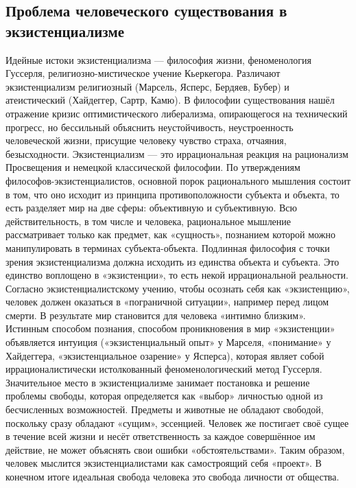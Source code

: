 \documentclass[12pt]{article}
\begin{document}
\subsection{Проблема человеческого существования в экзистенциализме}
Идейные истоки экзистенциализма — философия жизни, феноменология Гуссерля, религиозно-мистическое
учение  Кьеркегора.  Различают  экзистенциализм  религиозный  (Марсель,  Ясперс,  Бердяев,  Бубер)  и
атеистический  (Хайдеггер,  Сартр,  Камю).  В  философии  существования  нашёл  отражение  кризис
оптимистического  либерализма,  опирающегося  на  технический  прогресс,  но  бессильный  объяснить
неустойчивость,  неустроенность  человеческой  жизни,  присущие  человеку  чувство  страха,  отчаяния,
безысходности.
Экзистенциализм  —  это  иррациональная  реакция  на  рационализм  Просвещения  и  немецкой  классической
философии.  По  утверждениям  философов-экзистенциалистов,  основной  порок  рационального  мышления
состоит в том, что оно исходит из принципа противоположности субъекта и объекта, то есть разделяет мир на
две  сферы:  объективную  и  субъективную.  Всю  действительность,  в  том  числе  и  человека,  рациональное
мышление рассматривает только как предмет, как «сущность», познанием которой можно манипулировать в
терминах  субъекта-объекта.  Подлинная  философия  с  точки  зрения  экзистенциализма  должна  исходить  из
единства  объекта  и  субъекта.  Это  единство  воплощено  в  «экзистенции»,  то  есть  некой  иррациональной
реальности.
Согласно экзистенциалистскому учению, чтобы осознать себя как «экзистенцию», человек должен оказаться в
«пограничной ситуации», например перед лицом смерти. В результате мир становится для человека «интимно
близким». Истинным способом познания, способом проникновения в мир «экзистенции» объявляется интуиция
(«экзистенциальный опыт» у Марселя, «понимание» у Хайдеггера, «экзистенциальное озарение» у Ясперса),
которая являет собой иррационалистически истолкованный феноменологический метод Гуссерля.
Значительное  место  в  экзистенциализме  занимает  постановка  и  решение  проблемы  свободы,  которая
определяется  как  «выбор»  личностью  одной  из  бесчисленных  возможностей.  Предметы  и  животные  не
обладают свободой, поскольку сразу обладают «сущим», эссенцией. Человек же постигает своё сущее в течение
всей жизни и несёт ответственность за каждое совершённое им действие, не может объяснять свои ошибки
«обстоятельствами». Таким образом, человек мыслится экзистенциалистами как самостроящий себя «проект».
В конечном итоге идеальная свобода человека это свобода личности от общества.
\end{document}
